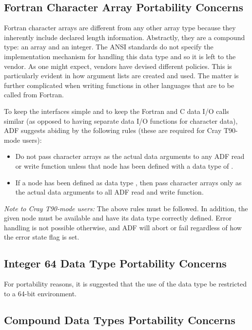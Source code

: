 \subsection{Fortran Character Array Portability Concerns}
\label{s:design:fortran}

Fortran character arrays are different from any other array type because
they inherently include declared length information.
Abstractly, they are a compound type: an array and an integer.
The ANSI standards do not specify the implementation mechanism for
handling this data type and so it is left to the vendor.
As one might expect, vendors have devised different policies.
This is particularly evident in how argument lists are created and used.
The matter is further complicated when writing functions in other
languages that are to be called from Fortran.

To keep the interfaces simple and to keep the Fortran and C data I/O
calls similar (as opposed to having separate data I/O functions for
character data), ADF suggests abiding by the following rules (these are
required for Cray T90-mode users):

\begin{itemize}
\item Do not pass character arrays as the actual data arguments to any
      ADF read or write function unless that node has been defined with a
      data type of .
\item If a node has been defined as data type , then pass
      character arrays only as the actual data arguments to all ADF read
      and write function.
\end{itemize}

\emph{Note to Cray T90-mode users:} The above rules must be followed.
In addition, the given node must be available and have its data type
correctly defined.
Error handling is not possible otherwise, and ADF will abort or fail
regardless of how the error state flag is set.

\subsection{Integer 64 Data Type Portability Concerns}

For portability reasons, it is suggested that the use of the 
data type be restricted to a 64-bit environment.

\subsection{Compound Data Types Portability Concerns}

